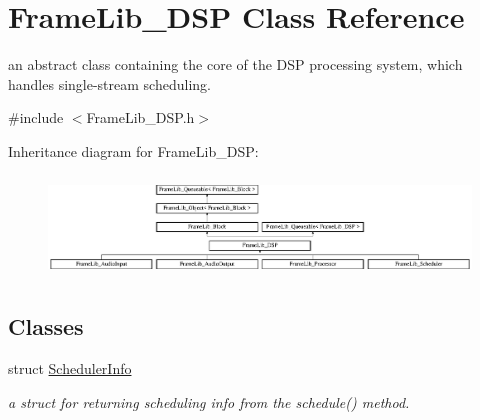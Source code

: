 \hypertarget{class_frame_lib___d_s_p}{}\section{Frame\+Lib\+\_\+\+D\+SP Class Reference}
\label{class_frame_lib___d_s_p}


an abstract class containing the core of the D\+SP processing system, which handles single-\/stream scheduling.  




{\ttfamily \#include $<$Frame\+Lib\+\_\+\+D\+S\+P.\+h$>$}

Inheritance diagram for Frame\+Lib\+\_\+\+D\+SP\+:\begin{figure}[H]
\begin{center}
\leavevmode
\includegraphics[height=2.723735cm]{class_frame_lib___d_s_p}
\end{center}
\end{figure}
\subsection*{Classes}
\begin{DoxyCompactItemize}
\item 
struct \hyperlink{struct_frame_lib___d_s_p_1_1_scheduler_info}{Scheduler\+Info}
\begin{DoxyCompactList}\small\item\em a struct for returning scheduling info from the schedule() method. \end{DoxyCompactList}\end{DoxyCompactItemize}
